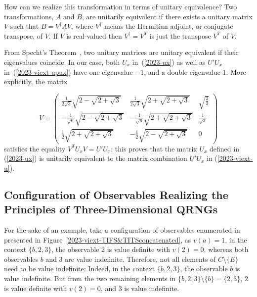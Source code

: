 \documentclass[%
 reprint,
 superscriptaddress,
 showpacs,
 showkeys,
 nofootinbib,
  amsmath,amssymb,
 pra,
  longbibliography,
  floatfix,
 ]{revtex4-2}
\theoremstyle{definition}
\begin{document}
How can we realize this transformation in terms of unitary equivalence?
Two transformations, $A$ and $B$, are unitarily equivalent if there exists a unitary matrix $V$ such that $B = V^\dagger AV$, where
$V^\dagger$ means the Hermitian adjoint, or conjugate transpose, of $V$.
If $V$ is real-valued then $V^\dagger =V^T$ is just the transpose $V^T$ of $V$.


From Specht's Theorem~\cite{Horn-Johnson-MatrixAnalysis,Dokovi__2007}, two unitary matrices are unitary equivalent if their eigenvalues coincide.
In our case, both $U_x$ in~(\ref{2023-ux}) as well as $U'U_x$ in~(\ref{2023-viext-upux}) have one eigenvalue $-1$, and a double eigenvalue $1$.
More explicitly, the matrix

\begin{equation}
V=
\begin{pmatrix}
 \frac{1}{2\sqrt{3}} \sqrt{2-\sqrt{2+\sqrt{3}}}
   & \frac{1}{2\sqrt{3}} \sqrt{2+\sqrt{2+\sqrt{3}}} & \sqrt{\frac{2}{3}} \\
 -\frac{1}{\sqrt{6}}\sqrt{2-\sqrt{2+\sqrt{3}}} &
   -\frac{1}{\sqrt{6}} \sqrt{2+\sqrt{2+\sqrt{3}}} &
   \frac{1}{\sqrt{3}} \\
 \frac{1}{2} \sqrt{2+\sqrt{2+\sqrt{3}}} & -\frac{1}{2}
   \sqrt{2-\sqrt{2+\sqrt{3}}} & 0
\end{pmatrix}
\end{equation}
satisfies the equality  $V^TU_xV=U'U_x$: this proves
 that the matrix $U_x$ defined in (\ref{2023-ux}) is unitarily equivalent to the matrix combination $U'U_x$ in (\ref{2023-viext-u}).



\subsection{Configuration of Observables Realizing the Principles of Three-Dimensional QRNGs}


For the sake of an example, take a configuration of observables enumerated  in~\cite[Table~I]{2018-minimalYIYS}
presented in Figure~\ref{2023-viext-TIFS&TITSconcatenated},  as $v(a)=1$,
in the context $\{b,2,3\}$, the observable $2$ is value definite with $v(2)=0$, whereas
both observables
$b$ and $3$ are value indefinite.
Therefore, not all elements of $C\setminus \{E\}$ need to be value indefinite:
Indeed, in the context $\{b,2,3\}$, the observable $b$ is value indefinite.
But from the two remaining elements in $\{b,2,3\} \setminus \{b\}=\{2,3\}$,
$2$ is value definite with $v(2)=0$,
and $3$ is value indefinite.
\end{document}
